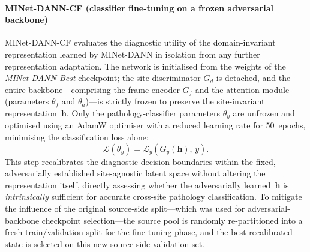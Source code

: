 \documentclass[preprint,12pt]{elsarticle}
\begin{document}
\paragraph{MINet-DANN-CF (classifier fine-tuning on a frozen
adversarial backbone)}
\label{par:MINet-DANN-CF}
MINet-DANN-CF evaluates the diagnostic utility of the
domain-invariant representation learned by MINet-DANN in
isolation from any further representation adaptation.
The network is initialised from the weights of the
\emph{MINet-DANN-Best} checkpoint; the site discriminator $G_d$
is detached, and the entire backbone---comprising the frame
encoder $G_f$ and the attention module (parameters $\theta_f$
and $\theta_a$)---is strictly frozen to preserve the
site-invariant representation~$\mathbf{h}$.
Only the pathology-classifier parameters $\theta_y$ are unfrozen
and optimised using an AdamW optimiser with a reduced learning
rate for 50~epochs, minimising the classification loss alone:
\begin{equation}
    \mathcal{L}(\theta_y)
    = \mathcal{L}_y\!\left(G_y(\mathbf{h}),\,y\right).
\end{equation}
This step recalibrates the diagnostic decision boundaries within
the fixed, adversarially established site-agnostic latent space
without altering the representation itself, directly assessing
whether the adversarially learned~$\mathbf{h}$ is
\emph{intrinsically} sufficient for accurate cross-site pathology
classification.
To mitigate the influence of the original source-side split---which
was used for adversarial-backbone checkpoint selection---the source
pool is randomly re-partitioned into a fresh train/validation
split for the fine-tuning phase, and the best recalibrated state
is selected on this new source-side validation set.

\end{document}
